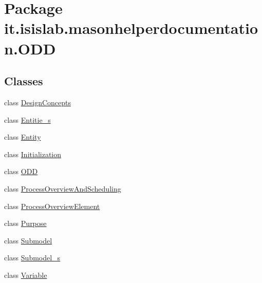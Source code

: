 \hypertarget{namespaceit_1_1isislab_1_1masonhelperdocumentation_1_1_o_d_d}{\section{Package it.\-isislab.\-masonhelperdocumentation.\-O\-D\-D}
\label{namespaceit_1_1isislab_1_1masonhelperdocumentation_1_1_o_d_d}
}
\subsection*{Classes}
\begin{DoxyCompactItemize}
\item 
class \hyperlink{classit_1_1isislab_1_1masonhelperdocumentation_1_1_o_d_d_1_1_design_concepts}{Design\-Concepts}
\item 
class \hyperlink{classit_1_1isislab_1_1masonhelperdocumentation_1_1_o_d_d_1_1_entitie__s}{Entitie\-\_\-s}
\item 
class \hyperlink{classit_1_1isislab_1_1masonhelperdocumentation_1_1_o_d_d_1_1_entity}{Entity}
\item 
class \hyperlink{classit_1_1isislab_1_1masonhelperdocumentation_1_1_o_d_d_1_1_initialization}{Initialization}
\item 
class \hyperlink{classit_1_1isislab_1_1masonhelperdocumentation_1_1_o_d_d_1_1_o_d_d}{O\-D\-D}
\item 
class \hyperlink{classit_1_1isislab_1_1masonhelperdocumentation_1_1_o_d_d_1_1_process_overview_and_scheduling}{Process\-Overview\-And\-Scheduling}
\item 
class \hyperlink{classit_1_1isislab_1_1masonhelperdocumentation_1_1_o_d_d_1_1_process_overview_element}{Process\-Overview\-Element}
\item 
class \hyperlink{classit_1_1isislab_1_1masonhelperdocumentation_1_1_o_d_d_1_1_purpose}{Purpose}
\item 
class \hyperlink{classit_1_1isislab_1_1masonhelperdocumentation_1_1_o_d_d_1_1_submodel}{Submodel}
\item 
class \hyperlink{classit_1_1isislab_1_1masonhelperdocumentation_1_1_o_d_d_1_1_submodel__s}{Submodel\-\_\-s}
\item 
class \hyperlink{classit_1_1isislab_1_1masonhelperdocumentation_1_1_o_d_d_1_1_variable}{Variable}
\end{DoxyCompactItemize}
